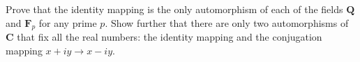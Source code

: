 Prove that the identity mapping is the only automorphism of each of the fields $\mathbf{Q}$ and $\mathbf{F}_p$ for any prime $p$. Show further that there are only two automorphisms of $\mathbf{C}$ that fix all the real numbers: the identity mapping and the conjugation mapping $x + iy \rightarrow x - iy$.
